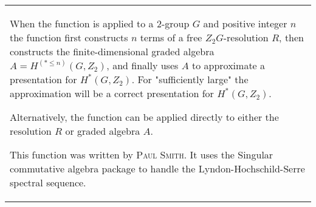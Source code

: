 \documentclass[a4paper,11pt]{report}
\begin{document}
{\begin{center}
\begin{tabular}{|l|}
 When the function is applied to a $2$-group $G$ and positive integer $n$ the function first constructs $n$ terms of a free $Z_2G$-resolution $R$, then constructs the finite-dimensional graded algebra $A=H^(*\le n)(G,Z_2)$, and finally uses $A$ to approximate a presentation for $H^*(G,Z_2)$. For "sufficiently large" the approximation will be a correct presentation
for $H^*(G,Z_2)$. 

 Alternatively, the function can be applied directly to either the resolution $R$ or graded algebra $A$. 

This function was written by \textsc{Paul Smith}. It uses the Singular commutative algebra package to handle the
Lyndon-Hochschild-Serre spectral sequence. \\
\end{tabular}\\[2mm]
\end{center}

 }

 
\end{document}
